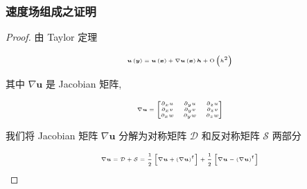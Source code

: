 \documentclass[aspectratio=2516]{beamer}
\begin{document}
\begin{frame}
\frametitle{ \kaishu 速度场组成之证明}

\vspace{-0.5cm}

\begin{proof}
	
	\kaishu 
	
	\tiny
	
	由 Taylor 定理
	
	\vspace{-0.15cm}
	
	\begin{equation}
	\tiny 
	\boldsymbol{u}\left( \boldsymbol{y} \right) = \boldsymbol{u}\left( \boldsymbol{x} \right) + \nabla \boldsymbol{u}\left( \boldsymbol{x} \right)\boldsymbol{h} + {\rm O}\left( {{h^2}} \right)
	\notag 
	\end{equation}
	
	\vspace{-0.15cm}
	
	其中 $ \nabla \boldsymbol{u} $ 是 Jacobian 矩阵, 
	
	\vspace{-0.15cm}
	
	\begin{equation}
	\tiny
	\nabla \boldsymbol{u} = \left[ {\begin{matrix}
		{{\partial _x}u} & {{\partial _y}u} & {{\partial _z}u}  \\ 
		{{\partial _x}v} & {{\partial _y}v} & {{\partial _z}v}  \\ 
		{{\partial _x}w} & {{\partial _y}w} & {{\partial _z}w}  \\ 
		\end{matrix} } \right]
	\notag 
	\end{equation}
	
	\vspace{-0.15cm}
	
	我们将 Jacobian 矩阵 $ \nabla \boldsymbol{u} $ 分解为对称矩阵 $ \mathcal{D} $ 和反对称矩阵 $ \mathcal{S} $ 两部分
	
	\vspace{-0.15cm}
	
	\begin{equation}
	\tiny
	\nabla \boldsymbol{u} = \mathcal{D} + \mathcal{S} = \frac{1}{2}\left[ {\nabla \boldsymbol{u} + {{\left( {\nabla \boldsymbol{u}} \right)}^t}} \right] + \frac{1}{2}\left[ {\nabla \boldsymbol{u} - {{\left( {\nabla \boldsymbol{u}} \right)}^t}} \right]
	\label{eq5.3.3}
	\end{equation}
	

\end{proof}
\end{frame}
\end{document}
